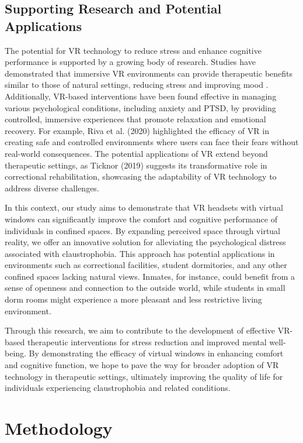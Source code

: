 \documentclass[runningheads]{llncs}
\begin{document}
\subsection{Supporting Research and Potential Applications}

The potential for VR technology to reduce stress and enhance cognitive performance is supported by a growing body of research. Studies have demonstrated that immersive VR environments can provide therapeutic benefits similar to those of natural settings, reducing stress and improving mood \cite{valchanov2010}. Additionally, VR-based interventions have been found effective in managing various psychological conditions, including anxiety and PTSD, by providing controlled, immersive experiences that promote relaxation and emotional recovery. For example, Riva et al. (2020) highlighted the efficacy of VR in creating safe and controlled environments where users can face their fears without real-world consequences. The potential applications of VR extend beyond therapeutic settings, as Ticknor (2019) suggests its transformative role in correctional rehabilitation, showcasing the adaptability of VR technology to address diverse challenges.

In this context, our study aims to demonstrate that VR headsets with virtual windows can significantly improve the comfort and cognitive performance of individuals in confined spaces. By expanding perceived space through virtual reality, we offer an innovative solution for alleviating the psychological distress associated with claustrophobia. This approach has potential applications in environments such as correctional facilities, student dormitories, and any other confined spaces lacking natural views. Inmates, for instance, could benefit from a sense of openness and connection to the outside world, while students in small dorm rooms might experience a more pleasant and less restrictive living environment.

Through this research, we aim to contribute to the development of effective VR-based therapeutic interventions for stress reduction and improved mental well-being. By demonstrating the efficacy of virtual windows in enhancing comfort and cognitive function, we hope to pave the way for broader adoption of VR technology in therapeutic settings, ultimately improving the quality of life for individuals experiencing claustrophobia and related conditions.
\section{Methodology}
\end{document}
